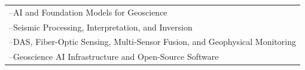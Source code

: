 \begingroup
\small
\newcommand{\researchitem}[1]{\RaggedRight\textcolor{firebrick}{--}\enspace #1\par}
\renewcommand{\arraystretch}{1.28}
\begin{tabular}{@{}p{.96\linewidth}@{}}
  \researchitem{AI and Foundation Models for Geoscience} \\
  \researchitem{Seismic Processing, Interpretation, and Inversion} \\
  \researchitem{DAS, Fiber-Optic Sensing, Multi-Sensor Fusion, and Geophysical Monitoring} \\
  \researchitem{Geoscience AI Infrastructure and Open-Source Software} \\
\end{tabular}
\endgroup
